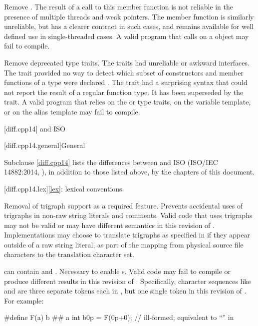 \nodiffref
\change
Remove .
\rationale
The result of a call to this member function is not reliable in the presence of
multiple threads and weak pointers. The member function  is
similarly unreliable, but has a clearer contract in such cases, and remains
available for well defined use in single-threaded cases.
\effect
A valid \CppXVII{} program that calls  on a 
object may fail to compile.

\change
Remove deprecated type traits.
\rationale
The traits had unreliable or awkward interfaces. The 
trait provided no way to detect which subset of constructors and member
functions of a type were declared . The 
trait had a surprising syntax that could not report the result of a regular
function type. It has been superseded by the  trait.
\effect
A valid \CppXVII{} program that relies on the  or
 type traits, on the  variable template,
or on the  alias template may fail to compile.

[diff.cpp14]{\Cpp{} and ISO \CppXIV{}}

[diff.cpp14.general]{General}

\pnum
{}%
Subclause \ref{diff.cpp14} lists the differences between \Cpp{} and
ISO \CppXIV{} (ISO/IEC 14882:2014, ),
in addition to those listed above,
by the chapters of this document.

[diff.cpp14.lex]{\ref{lex}: lexical conventions}

%
\change
Removal of trigraph support as a required feature.
\rationale
Prevents accidental uses of trigraphs in non-raw string literals and comments.
\effect
Valid \CppXIV{} code that uses trigraphs may not be valid or may have different
semantics in this revision of \Cpp{}. Implementations may choose to
translate trigraphs as specified in \CppXIV{} if they appear outside of a raw
string literal, as part of the  mapping from physical source file characters to
the translation character set.

\change
{} can contain   and
 .
\rationale
Necessary to enable s.
\effect
Valid \CppXIV{} code may fail to compile or produce different results in
this revision of \Cpp{}. Specifically, character sequences like 
and  are three separate tokens each in \CppXIV{}, but one single token
in this revision of \Cpp{}.
For example:
\begin{codeblock}
#define F(a) b ## a
int b0p = F(0p+0);  // ill-formed; equivalent to ``\!'' in \CppXIV{}
\end{codeblock}

